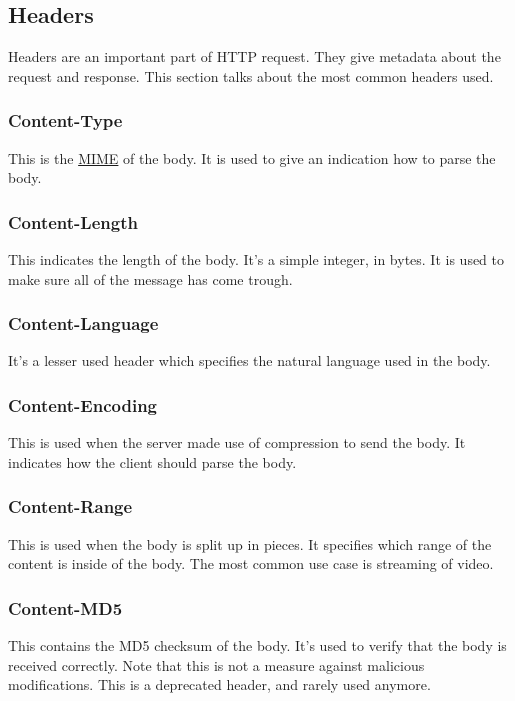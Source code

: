 \subsection{Headers}
Headers are an important part of HTTP request.
They give metadata about the request and response.
This section talks about the most common headers used.

\subsubsection{Content-Type}
This is the \href{https://developer.mozilla.org/en-US/docs/Web/HTTP/Basics_of_HTTP/MIME_types}{MIME} of the body.
It is used to give an indication how to parse the body.

\subsubsection{Content-Length}
This indicates the length of the body.
It's a simple integer, in bytes.
It is used to make sure all of the message has come trough.

\subsubsection{Content-Language}
It's a lesser used header which specifies the natural language used in the body.

\subsubsection{Content-Encoding}
This is used when the server made use of compression to send the body.
It indicates how the client should parse the body.

\subsubsection{Content-Range}
This is used when the body is split up in pieces.
It specifies which range of the content is inside of the body.
The most common use case is streaming of video.

\subsubsection{Content-MD5}
This contains the MD5 checksum of the body.
It's used to verify that the body is received correctly.
Note that this is not a measure against malicious modifications.
This is a deprecated header, and rarely used anymore.

